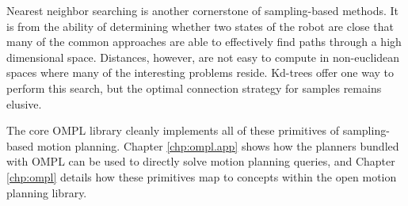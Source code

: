 Nearest neighbor searching is another cornerstone of sampling-based methods.
It is from the ability of determining whether two states of the robot are close
that many of the common approaches are able to effectively find paths through a
high dimensional space.  Distances, however, are not easy to compute in
non-euclidean spaces where many of the interesting problems reside.  Kd-trees
offer one way to perform this search, but the optimal connection strategy for
samples remains elusive.

The core OMPL library cleanly implements all of these primitives of
sampling-based motion planning.  Chapter \ref{chp:ompl.app} shows how the
planners bundled with OMPL can be used to directly solve motion planning
queries, and Chapter \ref{chp:ompl} details how these primitives map to concepts
within the open motion planning library.

